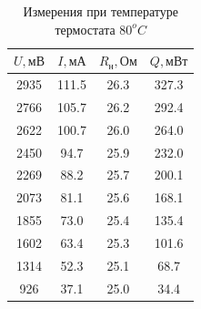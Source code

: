 \documentclass[a4paper, 12pt]{article}
\begin{document}
\begin{table}[!ht]
\begin{minipage}{.42\linewidth}
\begin{tabular}{|c|c|c|c|}
                    $U, мВ$ & $I, мА$ & $R_н, Ом$ & $Q, мВт$\\ \hline
                    2935 & 111.5 & 26.3 & 327.3\\ \hline
                    2766 & 105.7 & 26.2 & 292.4\\ \hline
                    2622 & 100.7 & 26.0 & 264.0\\ \hline
                    2450 & 94.7 & 25.9 & 232.0\\ \hline
                    2269 & 88.2 & 25.7 & 200.1\\ \hline
                    2073 & 81.1 & 25.6 & 168.1\\ \hline
                    1855 & 73.0 & 25.4 & 135.4\\ \hline
                    1602 & 63.4 & 25.3 & 101.6\\ \hline
                    1314 & 52.3 & 25.1 & 68.7\\ \hline
                    926 & 37.1 & 25.0 & 34.4\\ \hline

                \end{tabular}
                \caption{Измерения при температуре термостата $80^oC$}
                \label{table_80}
            \end{minipage}
        \end{table}
\end{document}
